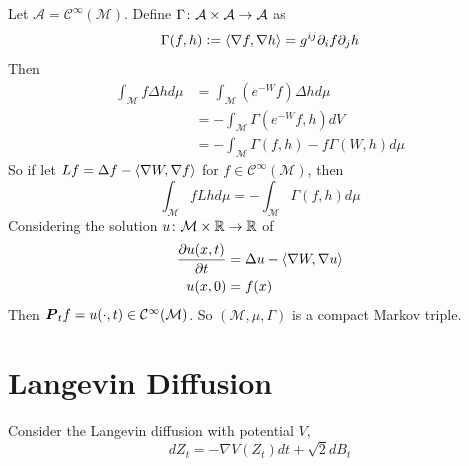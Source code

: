 \documentclass[a4paper,12pt]{article}
\begin{document}
\begin{itemize}
  \noindent Let $\mathcal{A} = \mathcal{C}^{\infty}(\mathcal{M})$. Define $\Gamma \colon \mathcal{A} \times \mathcal{A} \rightarrow \mathcal{A}$ as
  \begin{equation*}
    \Gamma(f,h) \vcentcolon= \left\langle \nabla f, \nabla h \right\rangle = g^{ij}\partial_i f \partial_j h
  \end{equation*}
  Then
  \begin{equation*}
    \begin{split}
      \int_\mathcal{M}f\Delta h d\mu &= \int_\mathcal{M}(e^{-W}f)\Delta h d\mu\\
      &= -\int_\mathcal{M} \Gamma(e^{-W}f,h) dV \\
      &= -\int_\mathcal{M} \Gamma(f,h) - f\Gamma(W,h) d\mu
    \end{split}
  \end{equation*}
  So if let $Lf = \Delta f - \left\langle \nabla W, \nabla f \right\rangle$ for $f \in \mathcal{C}^\infty(\mathcal{M})$, then
  \begin{equation*}
    \int_\mathcal{M} fLh d\mu = -\int_\mathcal{M}\Gamma(f,h)d\mu
  \end{equation*}
  Considering the solution $u \colon \mathcal{M} \times \mathbb{R} \rightarrow \mathbb{R}$ of
  \begin{equation*}
    \begin{split}
      \frac{\partial u(x,t)}{\partial t} &= \Delta u - \left\langle \nabla W, \nabla u \right\rangle \\
      u(x,0) &= f(x)
    \end{split}
  \end{equation*}
  Then $\boldsymbol{P}_tf = u(\cdot,t) \in \mathcal{C}^\infty(\mathcal{M})$. So $(\mathcal{M},\mu,\Gamma)$ is a compact Markov triple.
\end{itemize}

\section{Langevin Diffusion}
Consider the Langevin diffusion with potential $V$,
\begin{equation*}
  dZ_t = -\nabla V(Z_t)dt + \sqrt{2}dB_t
\end{equation*}
\end{document}
